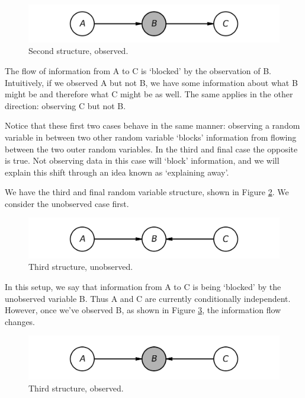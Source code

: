 \begin{figure}
	\centering
	\includegraphics[width=0.5\paperwidth]{../GraphicalModels/fig/second-case-observed.png}
	\caption{Second structure, observed.}
	\label{fig:second-case-observed}
\end{figure}

The flow of information from A to C is `blocked' by the observation of B. Intuitively, if we observed A but not B, we have some information about what B might be and therefore what C might be as well.  The same applies in the other direction: observing C but not B.

Notice that these first two cases behave in the same manner: observing a random variable in between two other random variable `blocks' information from flowing between the two outer random variables. In the third and final case the opposite is true. Not observing data in this case will `block' information, and we will explain this shift through an idea known as `explaining away'.

We have the third and final random variable structure, shown in Figure \ref{fig:third-case-unobserved}. We consider the unobserved case first.
\begin{figure}
	\centering
	\includegraphics[width=0.5\paperwidth]{../GraphicalModels/fig/third-case-unobserved.png}
	\caption{Third structure, unobserved.}
	\label{fig:third-case-unobserved}
\end{figure}

In this setup, we say that information from A to C is being `blocked' by the unobserved variable B. Thus A and C are currently conditionally independent. However, once we've observed B, as shown in Figure \ref{fig:third-case-observed}, the information flow changes.
\begin{figure}
	\centering
	\includegraphics[width=0.5\paperwidth]{../GraphicalModels/fig/third-case-observed.png}
	\caption{Third structure, observed.}
	\label{fig:third-case-observed}
\end{figure}

